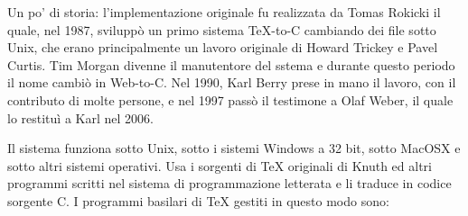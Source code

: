 \documentclass{article}
\begin{document}
Un po' di storia: l'implementazione originale fu realizzata da Tomas
Rokicki il quale, nel 1987, sviluppò un primo sistema \TeX{}-to-C
cambiando dei file sotto Unix, che erano principalmente un lavoro
originale di Howard Trickey e Pavel Curtis. Tim Morgan divenne il
manutentore del sstema e durante questo periodo il nome cambiò in
Web-to-C\@. Nel 1990, Karl Berry prese in mano il lavoro, con il
contributo di molte persone, e nel 1997 passò il testimone a Olaf Weber,
il quale lo restituì a Karl nel 2006.

Il sistema \Webc{} funziona sotto Unix, sotto i sistemi Windows a 32 bit,
sotto MacOSX{} e sotto altri sistemi operativi. Usa i sorgenti di \TeX{}
originali di Knuth ed altri programmi scritti nel sistema di
programmazione letterata \web{} e li traduce in codice sorgente C. I
programmi basilari di \TeX{} gestiti in questo modo sono:
\end{document}
